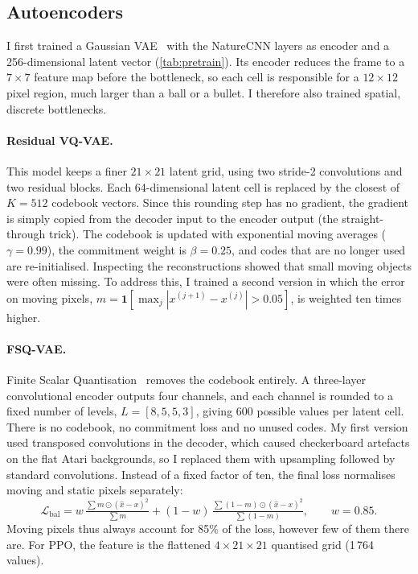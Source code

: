 \documentclass[runningheads]{llncs}
\begin{document}
\FloatBarrier
\subsection{Autoencoders}

I first trained a Gaussian VAE~\cite{kingma2014vae} with the NatureCNN layers as encoder and
a 256-dimensional latent vector (\cref{tab:pretrain}). Its encoder reduces the frame to a
$7\times7$ feature map before the bottleneck, so each cell is responsible for a $12\times12$
pixel region, much larger than a ball or a bullet. I therefore also trained spatial, discrete
bottlenecks.

\paragraph{Residual VQ-VAE.} This model keeps a finer $21\times21$ latent grid, using two
stride-2 convolutions and two residual blocks. Each 64-dimensional latent cell is replaced by
the closest of $K=512$ codebook vectors. Since this rounding step has no gradient, the
gradient is simply copied from the decoder input to the encoder output (the straight-through
trick). The codebook is updated with exponential moving averages
($\gamma=0.99$), the commitment weight is $\beta=0.25$, and codes that are no longer used are
re-initialised. Inspecting the reconstructions showed that small moving objects were often
missing. To address this, I trained a second version in which the error on moving pixels,
$m=\mathbf{1}[\max_j|x^{(j+1)}-x^{(j)}|>0.05]$, is weighted ten times higher.

\paragraph{FSQ-VAE.} Finite Scalar Quantisation~\cite{mentzer2024fsq} removes the codebook
entirely. A three-layer convolutional encoder outputs four channels, and each channel is
rounded to a fixed number of levels, $L=[8,5,5,3]$, giving 600 possible values per latent cell.
There is no codebook, no commitment loss and no unused codes. My first version
used transposed convolutions in the decoder, which caused checkerboard artefacts on the flat
Atari backgrounds, so I replaced them with upsampling followed by standard convolutions.
Instead of a fixed factor of ten, the final loss normalises moving and static pixels
separately:
\begin{equation}
  \mathcal{L}_{\text{bal}} = w\,\tfrac{\sum m\odot(\hat x-x)^2}{\sum m}
  +(1-w)\,\tfrac{\sum (1-m)\odot(\hat x-x)^2}{\sum (1-m)},\qquad w=0.85.
\end{equation}
Moving pixels thus always account for 85\% of the loss, however few of them there are.
For PPO, the feature is the flattened $4\times21\times21$ quantised grid (1\,764 values).
\end{document}
